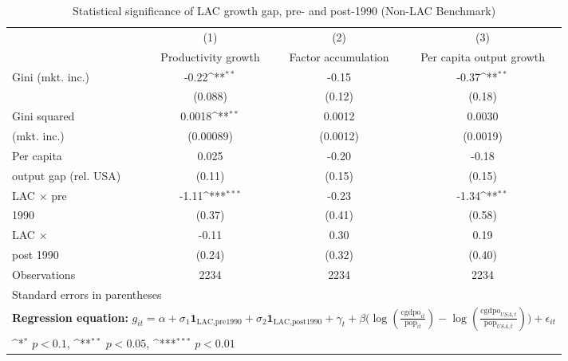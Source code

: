 \begin{table}[htbp]\centering
\def\sym#1{\ifmmode^{#1}\else\(^{#1}\)\fi}
\caption{Statistical significance of LAC growth gap, pre- and post-1990 (Non-LAC Benchmark)}
\begin{tabular}{l*{3}{c}}
\toprule
                &\multicolumn{1}{c}{(1)}&\multicolumn{1}{c}{(2)}&\multicolumn{1}{c}{(3)}\\
                &\multicolumn{1}{c}{Productivity growth}&\multicolumn{1}{c}{Factor accumulation}&\multicolumn{1}{c}{Per capita output growth}\\
\midrule
Gini (mkt. inc.)&    -0.22\sym{**} &    -0.15         &    -0.37\sym{**} \\
                &  (0.088)         &   (0.12)         &   (0.18)         \\
\addlinespace
Gini squared    &   0.0018\sym{**} &   0.0012         &   0.0030         \\
(mkt. inc.)     &(0.00089)         & (0.0012)         & (0.0019)         \\
\addlinespace
Per capita      &    0.025         &    -0.20         &    -0.18         \\
output gap (rel. USA)&   (0.11)         &   (0.15)         &   (0.15)         \\
\addlinespace
LAC $\times$ pre&    -1.11\sym{***}&    -0.23         &    -1.34\sym{**} \\
1990            &   (0.37)         &   (0.41)         &   (0.58)         \\
\addlinespace
LAC $\times$    &    -0.11         &     0.30         &     0.19         \\
post 1990       &   (0.24)         &   (0.32)         &   (0.40)         \\
\midrule
Observations    &     2234         &     2234         &     2234         \\
\bottomrule
\multicolumn{4}{l}{\footnotesize Standard errors in parentheses}\\
\multicolumn{4}{l}{\footnotesize \textbf{Regression equation:} \(g_{it} = \alpha + \sigma_1 \mathbf{1}_{\textrm{LAC,pre1990}} + \sigma_2 \mathbf{1}_{\textrm{LAC,post1990}} + \gamma_t + \beta \big(\log (\frac{\textrm{cgdpo}_{it}}{\textrm{pop}_{it}} ) - \log (\frac{\textrm{cgdpo}_{USA,t}}{\textrm{pop}_{USA,t}}  ) \big) + \epsilon_{it}\)}\\
\multicolumn{4}{l}{\footnotesize \sym{*} \(p<0.1\), \sym{**} \(p<0.05\), \sym{***} \(p<0.01\)}\\
\end{tabular}
\end{table}
